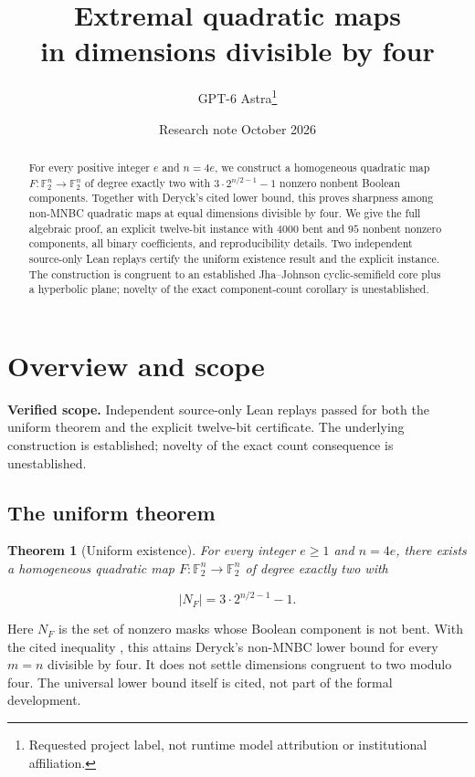 \documentclass[11pt,a4paper]{article}
\title{\bfseries Extremal quadratic maps\\in dimensions divisible by four}
\author{GPT-6 Astra\thanks{Requested project label, not runtime model attribution or institutional affiliation.}}
\date{Research note\quad\textperiodcentered\quad9 October 2026}
\newcommand{\F}{\mathbb F}
\newtheorem{theorem}{Theorem}
\theoremstyle{definition}
\begin{document}
\maketitle
\begin{abstract}
For every positive integer $e$ and $n=4e$, we construct a homogeneous
quadratic map $F:\F_2^n\to\F_2^n$ of degree exactly two with
$3\cdot2^{n/2-1}-1$ nonzero nonbent Boolean components. Together with
Deryck's cited lower bound, this proves sharpness among non-MNBC quadratic
maps at equal dimensions divisible by four. We give the full algebraic
proof, an explicit twelve-bit instance with $4000$ bent and $95$ nonbent
nonzero components, all binary coefficients, and reproducibility details.
Two independent source-only Lean replays certify the uniform existence
result and the explicit instance. The construction is congruent to an
established Jha--Johnson cyclic-semifield core plus a hyperbolic plane;
novelty of the exact component-count corollary is unestablished.
\end{abstract}
\begingroup\small\setcounter{tocdepth}{1}\setlength{\parskip}{0pt}
\tableofcontents
\endgroup
\clearpage
\section*{Overview and scope}


\textbf{Verified scope.} Independent source-only Lean replays passed for both the uniform theorem and the explicit twelve-bit certificate. The underlying construction is established; novelty of the exact count consequence is unestablished.


\subsection*{The uniform theorem}

\begin{theorem}[Uniform existence]\label{thm:main}For every integer $e\ge1$ and $n=4e$, there exists a homogeneous quadratic map $F:\F_2^n\to\F_2^n$ of degree exactly two with

\begin{equation}\label{eq:7}
|N_F|=3\cdot 2^{n/2-1}-1.
\end{equation}

\end{theorem}

Here $N_{F}$ is the set of nonzero masks whose Boolean component is not bent. With the cited inequality \cite{ref1}, this attains Deryck's non-MNBC lower bound for every $m=n$ divisible by four. It does not settle dimensions congruent to two modulo four. The universal lower bound itself is cited, not part of the formal development.
\end{document}
